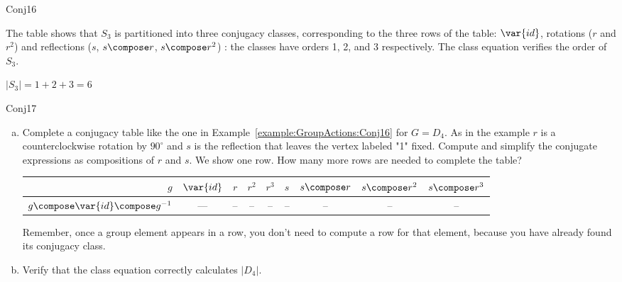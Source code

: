 \begin{example}{Conj16}

The table shows that $S_3$ is partitioned into  three conjugacy classes, corresponding to the three rows of the table: $\var{id}$, rotations ($r$ and $r^2$) and reflections ($s$, $s \compose r$, $s \compose r^2$) : the classes have orders 1, 2, and 3 respectively.  The class equation verifies the order of $S_3$.

$|S_3|=1+2+3=6$
\end{example}

\begin{exercise}{Conj17}
\begin{enumerate}[(a)]
\item Complete a conjugacy table like the one in  Example~\ref{example:GroupActions:Conj16} for $G=D_4$. As in the example $r$ is a counterclockwise rotation by  $90^{\circ}$ and $s$ is the reflection that leaves the vertex labeled "1" fixed. Compute and simplify the conjugate expressions as compositions of $r$ and $s$. We show one row.  How many more rows are needed to complete the table?

\begin{center}

\begin{tabular}{ |r| c | c |c |c |c |c | c|c |} \hline
  $g$ &$\var{id}$ & $r$ &$r^2$ &$r^3$ & $s$ &$s\compose r$ & $s\compose r ^2$ & $s\compose r^3$\\ \hline
  $g\compose \var{id}\compose g^{-1}$ &--- & -- & -- &-- &--&--&--&-- \\
\end{tabular}
\end{center}

 Remember, once a group element appears in a row, you don't need to compute a row for that element, because you have already found its conjugacy class.
\item Verify that the class equation correctly calculates $|D_4|$.
\end{enumerate}
\end{exercise}

